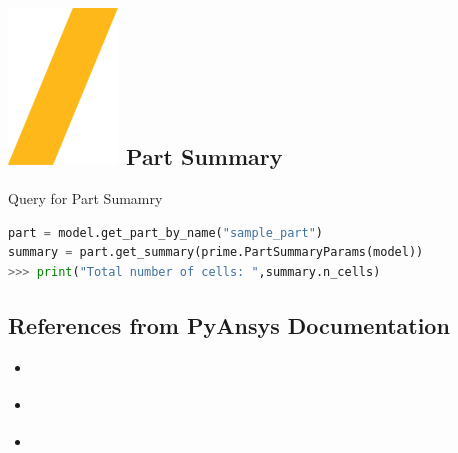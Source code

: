 \documentclass[9pt,landscape]{article}
\begin{document}
\begin{multicols}{3}
\section{\includegraphics[height=\fontcharht\font`\S]{slash.png} Part Summary}
Query for Part Sumamry
\begin{lstlisting}[language=Python]
part = model.get_part_by_name("sample_part")
summary = part.get_summary(prime.PartSummaryParams(model))
>>> print("Total number of cells: ",summary.n_cells)
\end{lstlisting}


\subsection{References from PyAnsys Documentation}
\begin{itemize}
\item \href{https://prime.docs.pyansys.com/version/stable/getting_started/index.html}{\color{blue}{PyPrimeMesh - Getting Started}}
\item \href{https://prime.docs.pyansys.com/version/stable/user_guide/index.html}{\color{blue}{PyPrimeMesh - User guide}}
\item \href{https://prime.docs.pyansys.com/version/stable/examples/index.html}{\color{blue}{PyPrimeMesh - Examples}}
\end{itemize}
\end{multicols}
\end{document}
